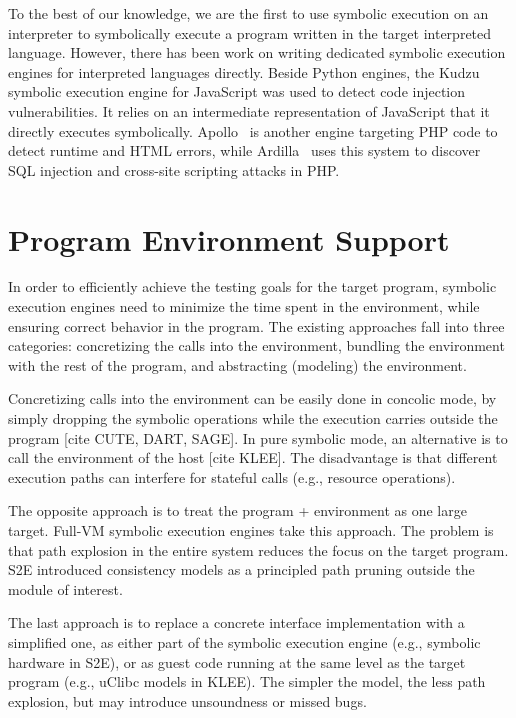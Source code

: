 To the best of our knowledge, we are the first to use symbolic execution on an interpreter to symbolically execute a program written in the target interpreted language.  However, there has been work on writing dedicated symbolic execution engines for interpreted languages directly.  Beside Python engines, the Kudzu~\cite{saxena-kudzu} symbolic execution engine for JavaScript was used to detect code injection vulnerabilities. It relies on an intermediate representation of JavaScript that it directly executes symbolically.
%
Apollo~\cite{artzi-apollo} is another engine targeting PHP code to detect runtime and HTML errors, while Ardilla~\cite{kiezun-ardilla} uses this system to discover SQL injection and cross-site scripting attacks in PHP.



\section{Program Environment Support}

In order to efficiently achieve the testing goals for the target program, symbolic execution engines need to minimize the time spent in the environment, while ensuring correct behavior in the program.
%
The existing approaches fall into three categories: concretizing the calls into the environment, bundling the environment with the rest of the program, and abstracting (modeling) the environment.

Concretizing calls into the environment can be easily done in concolic mode, by simply dropping the symbolic operations while the execution carries outside the program [cite CUTE, DART, SAGE].  In pure symbolic mode, an alternative is to call the environment of the host [cite KLEE].  The disadvantage is that different execution paths can interfere for stateful calls (e.g., resource operations).

The opposite approach is to treat the program + environment as one large target.  Full-VM symbolic execution engines take this approach.  The problem is that path explosion in the entire system reduces the focus on the target program.  S2E introduced consistency models as a principled path pruning outside the module of interest.

The last approach is to replace a concrete interface implementation with a simplified one, as either part of the symbolic execution engine (e.g., symbolic hardware in S2E), or as guest code running at the same level as the target program (e.g., uClibc models in KLEE).  The simpler the model, the less path explosion, but may introduce unsoundness or missed bugs.

